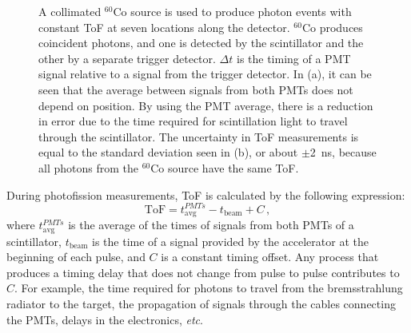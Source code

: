 \documentclass[%
 reprint,
 calc,
 amsmath,amssymb,
 aps,
 nofootinbib,
 linenumbers
]{revtex4-1}
\begin{document}
\begin{figure}[h]
\caption{A collimated $^{60}$Co source is used to produce photon events with constant ToF at seven locations along the detector.
$^{60}$Co produces coincident photons, and one is detected by the scintillator and the other by a separate trigger detector.
 $\Delta t$ is the timing of a PMT signal relative to a signal from the trigger detector. 
 In (a), it can be seen that the average between signals from both PMTs does not depend on position.
By using the PMT average, there is a reduction in error due to the time required for scintillation light to travel through the scintillator.
The uncertainty in ToF measurements is equal to the standard deviation seen in (b), or about $\pm$2~ns, because all photons from the $^{60}$Co source have the same ToF.}
\label{fig:ConstPMTAvg}
\end{figure}

During photofission measurements, ToF is calculated by the following expression:
\begin{equation}
\label{eq:ToF}
\text{ToF} = t^{PMTs}_{\text{avg}} - t_{\text{beam}} + C \, ,
\end{equation}
where $t^{PMTs}_{\text{avg}}$ is the average of the times of signals from both PMTs of a scintillator, $t_{\text{beam}}$ is the time of a signal provided by the accelerator at the beginning of each pulse, and $C$ is a constant timing offset.
Any process that produces a timing delay that does not change from pulse to pulse contributes to $C$.
For example, the time required for photons to travel from the bremsstrahlung radiator to the target, the propagation of signals through the cables connecting the PMTs, delays in the electronics, {\em{etc}}.
\end{document}
